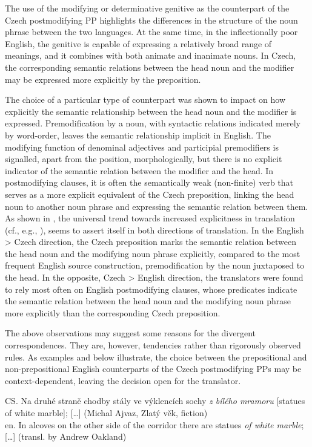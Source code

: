 \documentclass[output=paper]{langscibook}
\begin{document}
The use of the modifying or determinative genitive as the counterpart of the Czech postmodifying PP highlights the differences in the structure of the noun phrase between the two languages. At the same time, in the inflectionally poor English, the genitive is capable of expressing a relatively broad range of meanings, and it combines with both animate and inanimate nouns. In Czech, the corresponding semantic relations between the head noun and the modifier may be expressed more explicitly by the preposition.

The choice of a particular type of counterpart was shown to impact on how explicitly the semantic relationship between the head noun and the modifier is expressed. Premodification by a noun, with syntactic relations indicated merely by word-order, leaves the semantic relationship implicit in English. The modifying function of denominal adjectives and participial premodifiers is signalled, apart from the position, morphologically, but there is no explicit indicator of the semantic relation between the modifier and the head. In postmodifying clauses, it is often the semantically weak (non-finite) verb that serves as a more explicit equivalent of the Czech preposition, linking the head noun to another noun phrase and expressing the semantic relation between them. As shown in , the universal trend towards increased explicitness in translation (cf., e.g., \citealt{BernardiniRusso2018}), seems to assert itself in both directions of translation. In the English > Czech direction, the Czech preposition marks the semantic relation between the head noun and the modifying noun phrase explicitly, compared to the most frequent English source construction, premodification by the noun juxtaposed to the head.  In the opposite, Czech > English direction, the translators were found to rely most often on English postmodifying clauses, whose predicates indicate the semantic relation between the head noun and the modifying noun phrase more explicitly than the corresponding Czech preposition.

The above observations may suggest some reasons for the divergent correspondences. They are, however, tendencies rather than rigorously observed rules. As examples  and  below illustrate, the choice between the prepositional and non-prepositional English counterparts of the Czech postmodifying PPs may be context-dependent, leaving the decision open for the translator.

\ea\label{ex:mala:11}
CS. Na druhé straně chodby stály ve výklencích sochy \textit{z bílého mramoru} [statues of white marble]; […] (Michal Ajvaz, Zlatý věk, fiction)\\
en. In alcoves on the other side of the corridor there are statues \textit{of white marble}; […] (transl. by Andrew Oakland)
\z
\end{document}
